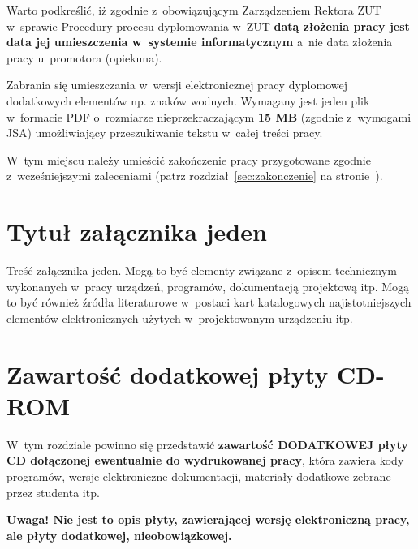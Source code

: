\documentclass[skorowidz,skroty]{dyplomWEZUT}
\begin{document}
Warto podkreślić, iż zgodnie z~obowiązującym Zarządzeniem Rektora ZUT w~sprawie Procedury procesu dyplomowania w~ZUT \textbf{datą złożenia pracy jest data jej umieszczenia w~systemie informatycznym} a~nie data złożenia pracy u~promotora (opiekuna).

Zabrania się umieszczania w~wersji elektronicznej pracy dyplomowej dodatkowych elementów np. znaków wodnych. Wymagany jest jeden plik w~formacie PDF o~rozmiarze nieprzekraczającym \textbf{15 MB} (zgodnie z~wymogami JSA) umożliwiający przeszukiwanie tekstu w~całej treści pracy.



\begin{zakonczenie}\label{chap:zakonczenie}
W~tym miejscu należy umieścić zakończenie pracy przygotowane zgodnie z~wcześniejszymi zaleceniami (patrz rozdział~\ref{sec:zakonczenie} na stronie~\pageref{sec:zakonczenie}).
\end{zakonczenie}


\appendix

\chapter{Tytuł załącznika jeden}\label{chap:dodatek1}

Treść załącznika jeden. Mogą to być elementy związane z~opisem technicznym wykonanych w~pracy urządzeń, programów, dokumentacją projektową itp. Mogą to być również źródła literaturowe w~postaci kart katalogowych najistotniejszych elementów elektronicznych użytych w~projektowanym urządzeniu itp.

\chapter{Zawartość dodatkowej płyty CD-ROM}\label{chap:dodatkowyCD}

W~tym rozdziale powinno się przedstawić \textbf{zawartość DODATKOWEJ płyty CD dołączonej ewentualnie do wydrukowanej pracy}, która zawiera kody programów, wersje elektroniczne dokumentacji, materiały dodatkowe zebrane przez studenta itp.

\noindent\textbf{Uwaga! Nie jest to opis płyty, zawierającej wersję elektroniczną pracy, ale płyty dodatkowej, nieobowiązkowej.}

\end{document}
